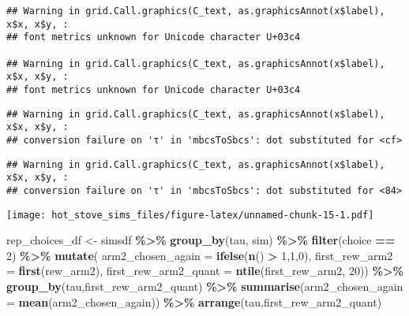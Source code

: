 \documentclass[
]{article}
\newenvironment{Shaded}{\begin{snugshade}}{\end{snugshade}}
\newcommand{\AttributeTok}[1]{\textcolor[rgb]{0.13,0.29,0.53}{#1}}
\newcommand{\DecValTok}[1]{\textcolor[rgb]{0.00,0.00,0.81}{#1}}
\newcommand{\FunctionTok}[1]{\textcolor[rgb]{0.13,0.29,0.53}{\textbf{#1}}}
\newcommand{\NormalTok}[1]{#1}
\newcommand{\OtherTok}[1]{\textcolor[rgb]{0.56,0.35,0.01}{#1}}
\newcommand{\SpecialCharTok}[1]{\textcolor[rgb]{0.81,0.36,0.00}{\textbf{#1}}}
\begin{document}
\begin{verbatim}
## Warning in grid.Call.graphics(C_text, as.graphicsAnnot(x$label), x$x, x$y, :
## font metrics unknown for Unicode character U+03c4

## Warning in grid.Call.graphics(C_text, as.graphicsAnnot(x$label), x$x, x$y, :
## font metrics unknown for Unicode character U+03c4
\end{verbatim}

\begin{verbatim}
## Warning in grid.Call.graphics(C_text, as.graphicsAnnot(x$label), x$x, x$y, :
## conversion failure on 'τ' in 'mbcsToSbcs': dot substituted for <cf>
\end{verbatim}

\begin{verbatim}
## Warning in grid.Call.graphics(C_text, as.graphicsAnnot(x$label), x$x, x$y, :
## conversion failure on 'τ' in 'mbcsToSbcs': dot substituted for <84>
\end{verbatim}

\texttt{[image: hot\_stove\_sims\_files/figure-latex/unnamed-chunk-15-1.pdf]}

\begin{Shaded}
\begin{Highlighting}[]
\NormalTok{rep\_choices\_df }\OtherTok{\textless{}{-}}\NormalTok{ simsdf }\SpecialCharTok{\%\textgreater{}\%}
  \FunctionTok{group\_by}\NormalTok{(tau, sim) }\SpecialCharTok{\%\textgreater{}\%}
  \FunctionTok{filter}\NormalTok{(choice }\SpecialCharTok{==} \DecValTok{2}\NormalTok{) }\SpecialCharTok{\%\textgreater{}\%}
  \FunctionTok{mutate}\NormalTok{(}
    \AttributeTok{arm2\_chosen\_again =} \FunctionTok{ifelse}\NormalTok{(}\FunctionTok{n}\NormalTok{() }\SpecialCharTok{\textgreater{}} \DecValTok{1}\NormalTok{,}\DecValTok{1}\NormalTok{,}\DecValTok{0}\NormalTok{),}
    \AttributeTok{first\_rew\_arm2 =} \FunctionTok{first}\NormalTok{(rew\_arm2),}
    \AttributeTok{first\_rew\_arm2\_quant =} \FunctionTok{ntile}\NormalTok{(first\_rew\_arm2, }\DecValTok{20}\NormalTok{)) }\SpecialCharTok{\%\textgreater{}\%}
  \FunctionTok{group\_by}\NormalTok{(tau,first\_rew\_arm2\_quant) }\SpecialCharTok{\%\textgreater{}\%}
  \FunctionTok{summarise}\NormalTok{(}\AttributeTok{arm2\_chosen\_again =} \FunctionTok{mean}\NormalTok{(arm2\_chosen\_again)) }\SpecialCharTok{\%\textgreater{}\%}
  \FunctionTok{arrange}\NormalTok{(tau,first\_rew\_arm2\_quant)}
\end{Highlighting}
\end{Shaded}
\end{document}
